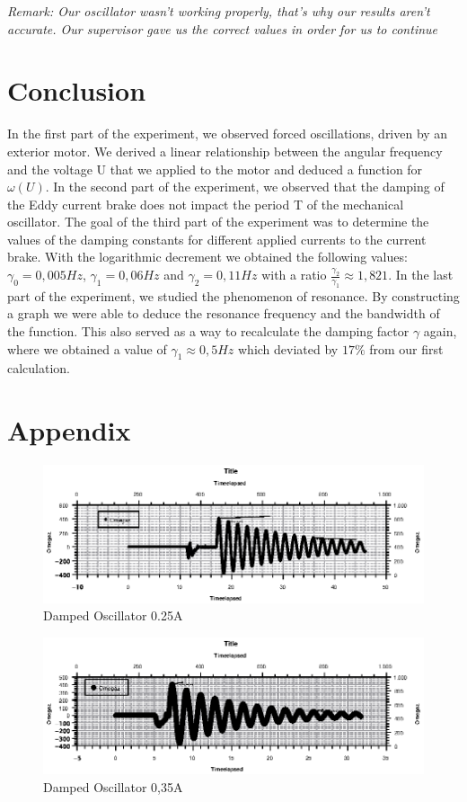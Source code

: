 \documentclass{scrartcl}
\begin{document}
\textit{Remark: Our oscillator wasn't working properly, that's why our results aren't accurate. Our supervisor gave us the correct values in order for us to continue}

\section{Conclusion}
In the first part of the experiment, we observed forced oscillations, driven by an exterior motor. We derived a linear relationship between the angular frequency and the voltage U that we applied to the motor and deduced a function for $\omega(U)$. In the second part of the experiment, we observed that the damping of the Eddy current brake does not impact the period T of the mechanical oscillator. The goal of the third part of the experiment was to determine the values of the damping constants for different applied currents to the current brake. With the logarithmic decrement we obtained the following values: $\gamma_0=0,005Hz$, $\gamma_1=0,06Hz$ and $\gamma_2=0,11Hz$ with a ratio $\frac{\gamma_2}{\gamma_1}\approx1,821$. In the last part of the experiment, we studied the phenomenon of resonance. By constructing a graph we were able to deduce the resonance frequency and the bandwidth of the function. This also served as a way to recalculate the damping factor $\gamma$ again, where we obtained a value of $\gamma_1\approx0,5Hz$ which deviated by $17\%$ from our first calculation. 


\section{Appendix}

\begin{figure}[h]
    \centering
    \includegraphics[width=16cm]{Graph1.eps}
    \caption{Damped Oscillator 0.25A}
    \label{fig:}
\end{figure}

\begin{figure}[h]
    \centering
    \includegraphics[width=16cm]{Graph2.eps}
    \caption{Damped Oscillator 0,35A}
    \label{fig:}
\end{figure}
\end{document}
